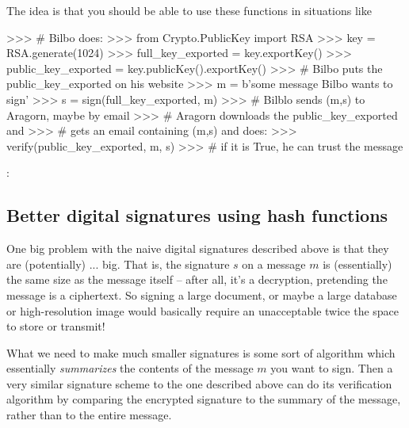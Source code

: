 \documentclass[12pt,letterpaper]{amsbook}
\theoremstyle{definition}
\theoremstyle{remark}
\numberwithin{figure}{section}
\numberwithin{exercise}{chapter}
\numberwithin{section}{chapter}
\numberwithin{equation}{section}
\numberwithin{table}{subsection}
\newcommand{\ix}[1]{{#1}\index{#1}}
\begin{document}
\begin{CTtcb}[label=ct:naiveDS]{}{}
 The idea is that you should be able to use these functions in situations like\\
\begin{codedisp}
>>> # Bilbo does:
>>> from Crypto.PublicKey import RSA
>>> key = RSA.generate(1024)
>>> full_key_exported = key.exportKey()
>>> public_key_exported = key.publicKey().exportKey()
>>> # Bilbo puts the public_key_exported on his website
>>> m = b'some message Bilbo wants to sign'
>>> s = sign(full_key_exported, m)
>>> # Bilblo sends (m,s) to Aragorn, maybe by email
>>> # Aragorn downloads the public_key_exported and
>>> # gets an email containing (m,s) and does:
>>> verify(public_key_exported, m, s)
>>> # if it is True, he can trust the message
\end{codedisp}
:
 
\end{CTtcb}

\vskip1cm
\subsection{Better digital signatures using hash functions}
\label{ssec:DS_Ndsuhf}

One big problem with the naive \ix{digital signature}s
described above is that they are (potentially) ... big.  That is, the signature
$s$ on a message $m$ is (essentially) the same size as the message itself --
after all, it's a decryption, pretending the message is a ciphertext.  So
signing a large document, or maybe a large database or high-resolution image
would basically require an unacceptable twice the space to store or transmit!

What we need to make much smaller
signatures is some sort of
algorithm which essentially \emph{summarizes} the contents of the message $m$
you want to sign.  Then a very similar
signature scheme to the one
described above can do its verification algorithm by comparing
the encrypted signature to the summary of the message, rather than to the
entire message.
\end{document}
